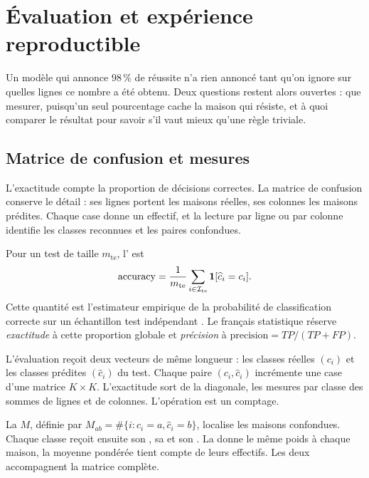 \chapter{Évaluation et expérience reproductible}
\label{ch:evaluation}

\begin{lecture}
Un modèle qui annonce $98\,\%$ de réussite n'a rien annoncé tant qu'on ignore
sur quelles lignes ce nombre a été obtenu. Deux questions restent alors
ouvertes : que mesurer, puisqu'un seul pourcentage cache la maison qui résiste,
et à quoi comparer le résultat pour savoir s'il vaut mieux qu'une règle triviale.
\end{lecture}

\section{Matrice de confusion et mesures}

\begin{lecture}
L'exactitude compte la proportion de décisions correctes. La matrice de confusion
conserve le détail : ses lignes portent les maisons réelles, ses colonnes les
maisons prédites. Chaque case donne un effectif, et la lecture par ligne ou par
colonne identifie les classes reconnues et les paires confondues.
\end{lecture}

Pour un test de taille $m_{\mathrm{te}}$, l' est
\[
  \operatorname{accuracy}=\frac1{m_{\mathrm{te}}}
  \sum_{i\in\mathcal I_{\mathrm{te}}}\mathbf{1}[\widehat c_i=c_i].
\]
Cette quantité est l'estimateur empirique de la probabilité de classification
correcte sur un échantillon test indépendant \cite[chap.~7]{hastie2009}.
Le français statistique réserve \emph{exactitude} à cette proportion globale et
\emph{précision} à $\mathrm{precision}=TP/(TP+FP)$.

L'évaluation reçoit deux vecteurs de même longueur : les classes réelles $(c_i)$
et les classes prédites $(\widehat c_i)$ du test. Chaque paire
$(c_i,\widehat c_i)$ incrémente une case d'une matrice $K\times K$. L'exactitude
sort de la diagonale, les mesures par classe des sommes de lignes et de colonnes.
L'opération est un comptage.

La  $M$, définie par $M_{ab}=\#\{i:c_i=a,\widehat c_i=b\}$,
localise les maisons confondues. Chaque classe reçoit ensuite son , sa
 et son . La  donne le même poids à chaque
maison, la moyenne pondérée tient compte de leurs effectifs. Les deux accompagnent
la matrice complète.

